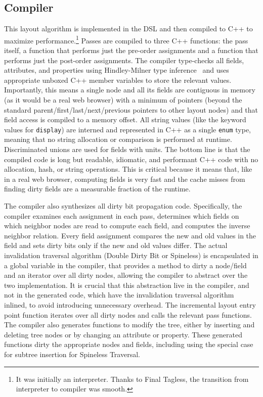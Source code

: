 \subsection{Compiler}
\label{sec-compiler}
This layout algorithm is implemented in the DSL
  and then compiled to C++ to maximize performance.\footnote{It was initially an interpreter. Thanks to Final Tagless\cite{FTG}, the transition from interpreter to compiler was smooth.}
Passes are compiled to three C++ functions:
  the pass itself,
  a function that performs just the pre-order assignments
  and a function that performs just the post-order assignments.
The compiler type-checks all fields, attributes, and properties
  using Hindley-Milner type inference~\cite{HM}
  and uses appropriate unboxed C++ member variables
  to store the relevant values.
Importantly, this means a single node and all its fields
  are contiguous in memory
  (as it would be a real web browser)
  with a minimum of pointers
  (beyond the standard parent/first/last/next/previous pointers
  to other layout nodes)
  and that field access is compiled to a memory offset.
All string values (like the keyword values for \texttt{display})
  are interned and represented in C++ as
  a single \texttt{enum} type,
  meaning that no string allocation or comparison
  is performed at runtime.
Discriminated unions are used for fields with units.
The bottom line is that the compiled code is
  long but readable, idiomatic, and performant C++ code
  with no allocation, hash, or string operations.
This is critical because it means that,
  like in a real web browser,
  computing fields is very fast
  and the cache misses from finding dirty fields
  are a measurable fraction of the runtime.

The compiler also synthesizes all
  dirty bit propagation code.
Specifically, the compiler examines
  each assignment in each pass,
  determines which fields on which neighbor nodes are read
  to compute each field,
  and computes the inverse neighbor relation.
Every field assignment
  compares the new and old values in the field
  and sets dirty bits only if the new and old values differ.
The actual invalidation traversal algorithm
  (Double Dirty Bit or Spineless)
  is encapsulated in a global variable in the compiler,
  that provides a method to dirty a node/field
  and an iterator over all dirty nodes, 
  allowing the compiler to abstract over the two implementation.
It is crucial that this abstraction live in the compiler,
  and not in the generated code, 
  which have the invalidation traversal algorithm inlined,
  to avoid introducing unnecessary overhead.
The incremental layout entry point function
  iterates over all dirty nodes
  and calls the relevant pass functions.
The compiler also generates functions to modify the tree,
  either by inserting and deleting tree nodes
  or by changing an attribute or property.
These generated functions dirty the appropriate nodes and fields,
  including using the special case for subtree insertion
  for Spineless Traversal.

